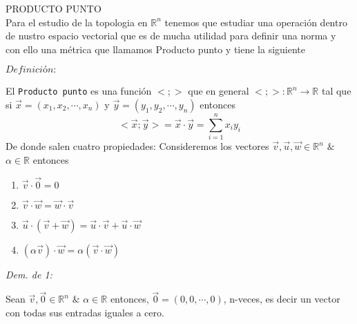 \documentclass[a4paper, 11pt]{article}
\begin{document}
PRODUCTO PUNTO\\
Para el estudio de la topologia en $\mathds{R}^n$ tenemos que estudiar una operaci\'on dentro de nustro espacio vectorial que es de mucha utilidad para definir una norma y con ello una m\'etrica que llamamos Producto punto y tiene la siguiente

\(\textit{Definici\'on}:\)

El \texttt{Producto punto} es una funci\'on $<;>$ que en general $<;> : \mathds{R}^n \rightarrow \mathds{R}$ tal que si $\vec{x} = (x_1, x_2, \cdots, x_n)$ y $\vec{y} = (y_1, y_2, \cdots, y_n)$ entonces 
$$
<\vec{x} ; \vec{y}> = \vec{x} \cdot \vec{y} = \sum_{i=1}^n{x_i y_i} 
$$
De donde salen cuatro propiedades:
Consideremos los vectores $\vec{v},\vec{u}, \vec{w} \in \mathds{R}^n$ $\&$ $\alpha \in \mathds{R}$ entonces

\begin{enumerate}
\item $\vec{v} \cdot \vec{0} = 0$
\item $\vec{v} \cdot \vec{w} = \vec{w} \cdot \vec{v}$
\item $\vec{u} \cdot (\vec{v} + \vec{w}) = \vec{u} \cdot \vec{v} + \vec{u} \cdot \vec{w}$
\item $(\alpha \vec{v}) \cdot \vec{w} = \alpha (\vec{v} \cdot \vec{w})$
\end{enumerate}
\textit{Dem. de 1:}
\begin{center}
Sean $\vec{v},\vec{0} \in \mathds{R}^n$ $\&$ $\alpha \in \mathds{R}$ entonces, 
$\vec{0} = (0,0, \cdots, 0)$, n-veces, es decir un vector con todas sus entradas iguales a cero.
\end{center}
\end{document}
